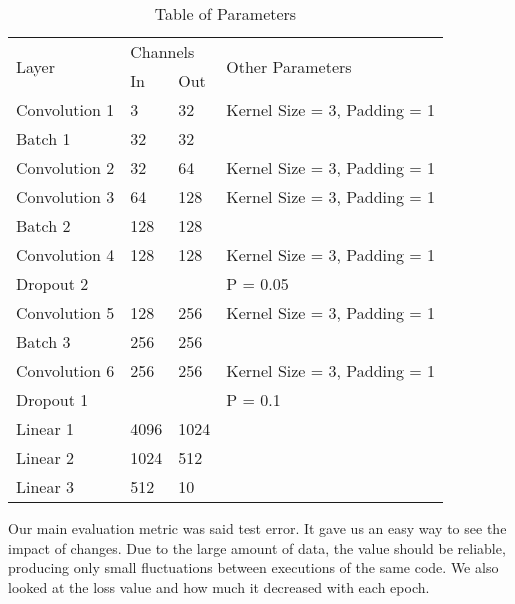 \documentclass[journal]{IEEEtran}
\begin{document}
\begin{table}[!h]
\centering
\caption{Table of Parameters}
\label{table:1}
\begin{tabular}{@{}llll@{}}
\toprule
\multirow{2}{*}{Layer} & \multicolumn{2}{l}{Channels} & \multirow{2}{*}{Other Parameters} \\ \cmidrule(lr){2-3}
              & In   & Out  &                              \\ \midrule
Convolution 1 & 3    & 32   & Kernel Size = 3, Padding = 1 \\
Batch 1       & 32   & 32   &                              \\
Convolution 2 & 32   & 64   & Kernel Size = 3, Padding = 1 \\ \midrule
Convolution 3 & 64   & 128  & Kernel Size = 3, Padding = 1 \\
Batch 2       & 128  & 128  &                              \\
Convolution 4 & 128  & 128  & Kernel Size = 3, Padding = 1 \\
Dropout 2     &      &      & P = 0.05                     \\ \midrule
Convolution 5 & 128  & 256  & Kernel Size = 3, Padding = 1 \\
Batch 3       & 256  & 256  &                              \\
Convolution 6 & 256  & 256  & Kernel Size = 3, Padding = 1 \\ \midrule
Dropout 1     &      &      & P = 0.1                      \\
Linear 1      & 4096 & 1024 &                              \\
Linear 2      & 1024 & 512  &                              \\
Linear 3      & 512  & 10   &                              \\ \bottomrule
\end{tabular}
\end{table}

Our main evaluation metric was said test error. It gave us an easy way to see the impact of changes. Due to the large amount of data, the value should be reliable, producing only small fluctuations between executions of the same code. We also looked at the loss value and how much it decreased with each epoch. 
\end{document}
